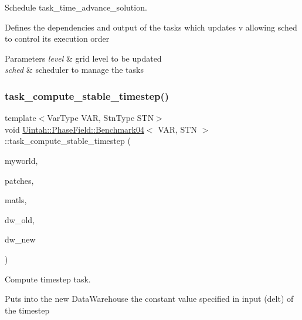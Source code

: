 Schedule task\+\_\+time\+\_\+advance\+\_\+solution. 

Defines the dependencies and output of the tasks which updates v allowing sched to control its execution order


\begin{DoxyParams}{Parameters}
{\em level} & grid level to be updated \\
\hline
{\em sched} & scheduler to manage the tasks \\
\hline
\end{DoxyParams}
\mbox{\label{classUintah_1_1PhaseField_1_1Benchmark04_a541c18c75f49e043193c13c729c84ceb}} 
\subsubsection{\texorpdfstring{task\+\_\+compute\+\_\+stable\+\_\+timestep()}{task\_compute\_stable\_timestep()}}
{\footnotesize\ttfamily template$<$Var\+Type V\+AR, Stn\+Type S\+TN$>$ \\
void \hyperlink{classUintah_1_1PhaseField_1_1Benchmark04}{Uintah\+::\+Phase\+Field\+::\+Benchmark04}$<$ V\+AR, S\+TN $>$\+::task\+\_\+compute\+\_\+stable\+\_\+timestep (\begin{DoxyParamCaption}\item[{Processor\+Group const $\ast$}]{myworld,  }\item[{Patch\+Subset const $\ast$}]{patches,  }\item[{Material\+Subset const $\ast$}]{matls,  }\item[{Data\+Warehouse $\ast$}]{dw\+\_\+old,  }\item[{Data\+Warehouse $\ast$}]{dw\+\_\+new }\end{DoxyParamCaption})\hspace{0.3cm}{\ttfamily [protected]}}



Compute timestep task. 

Puts into the new Data\+Warehouse the constant value specified in input (delt) of the timestep


